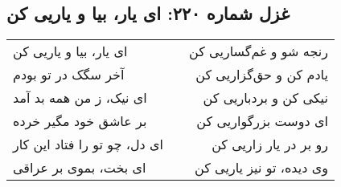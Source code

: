 \begin{center}
\section*{غزل شماره ۲۲۰: ای یار، بیا و یاریی کن}
\label{sec:220}
\begin{longtable}{l p{0.5cm} r}
ای یار، بیا و یاریی کن
&&
رنجه شو و غم‌گساریی کن
\\
آخر سگک در تو بودم
&&
یادم کن و حق‌گزاریی کن
\\
ای نیک، ز من همه بد آمد
&&
نیکی کن و بردباریی کن
\\
بر عاشق خود مگیر خرده
&&
ای دوست بزرگواریی کن
\\
ای دل، چو تو را فتاد این کار
&&
رو بر در یار زاریی کن
\\
ای بخت، بموی بر عراقی
&&
وی دیده، تو نیز یاریی کن
\\
\end{longtable}
\end{center}
